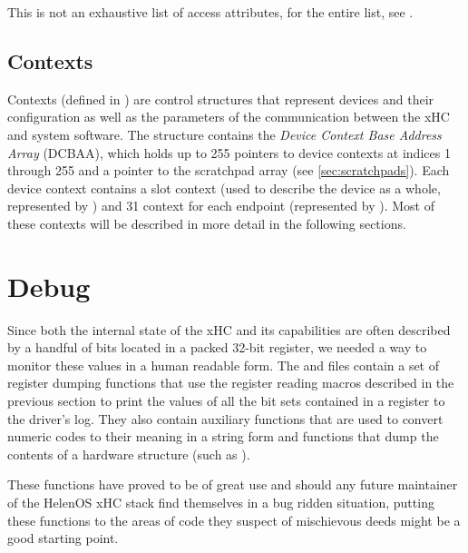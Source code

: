 This is not an exhaustive list of access attributes, for the entire list, see .


\subsection{Contexts}

Contexts (defined in )
are control structures that represent devices and their configuration as well
as the parameters of the communication between the xHC and system software. The
 structure contains the \textit{Device Context Base Address Array} (DCBAA), which
holds up to 255 pointers to device contexts at indices 1 through 255 and a pointer to
the scratchpad array (see \ref{sec:scratchpads}). Each device context contains a slot
context (used to describe the device as a whole, represented by ) and
31 context for each endpoint (represented by ). Most of these contexts
will be described in more detail in the following sections.


\section{Debug}

Since both the internal state of the xHC and its capabilities are often described by
a handful of bits located in a packed 32-bit register, we needed a way to monitor these
values in a human readable form. The  and
 files contain a set of register dumping
functions that use the register reading macros described in the previous section to print
the values of all the bit sets contained in a register to the driver's log. They also contain
auxiliary functions that are used to convert numeric codes to their meaning in a string form and
functions that dump the contents of a hardware structure (such as ).

These functions have proved to be of great use and should any future maintainer of the
HelenOS xHC stack find themselves in a bug ridden situation, putting these functions to
the areas of code they suspect of mischievous deeds might be a good starting point.

